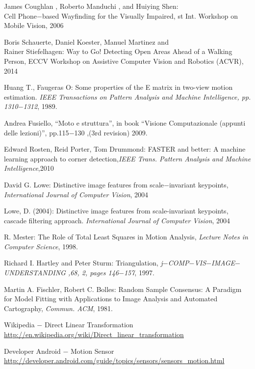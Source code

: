 \begin{thebibliography}{99}
 James Coughlan , Roberto Manduchi , and Huiying Shen: \\Cell Phone$-$based Wayfinding for the Visually Impaired, st Int. Workshop on Mobile Vision, 2006

 Boris Schauerte, Daniel Koester, Manuel Martinez and \\ Rainer Stiefelhagen: Way to Go! Detecting Open Areas Ahead of a Walking Person, ECCV Workshop on Assistive Computer Vision and Robotics (ACVR), 2014

 Huang T., Faugeras O: Some properties of the E matrix in two-view motion
estimation. \textit{IEEE Transactions on Pattern Analysis and Machine Intelligence, pp.
1310$-$1312}, 1989.

 Andrea Fusiello, “Moto e struttura”, in book “Visione Computazionale (appunti
delle lezioni)”, pp.115$-$130 ,(3rd revision) 2009.

 Edward Rosten, Reid Porter, Tom Drummond: FASTER and better: A machine learning approach to corner detection,\textit{IEEE Trans. Pattern Analysis and Machine Intelligence},2010

 David G. Lowe: Distinctive image features from scale$-$invariant keypoints, \textit{International Journal of Computer Vision}, 2004

 Lowe, D. (2004): Distinctive image features from scale-invariant keypoints,
cascade filtering approach. \textit{International Journal of Computer Vision}, 2004

 R. Mester: The Role of Total Least Squares in Motion Analysis,
\textit{Lecture Notes in Computer Science}, 1998.

 Richard I. Hartley and Peter Sturm: Triangulation, \textit{j$-$COMP$-$VIS$-$IMAGE$-$UNDERSTANDING ,68, 2, pages 146$-$157}, 1997.

 Martin A. Fischler, Robert C. Bolles: Random Sample Consensus: A Paradigm for Model Fitting with Applications to Image Analysis and Automated Cartography, \textit{Commun. ACM}, 1981.

 Wikipedia $-$ Direct Linear Transformation \newline \url{http://en.wikipedia.org/wiki/Direct\_linear\_transformation}

 Developer Android $-$ Motion Sensor \newline
\url{http://developer.android.com/guide/topics/sensors/sensors\_motion.html}


\end{thebibliography}
\clearpage
\thispagestyle{empty}
